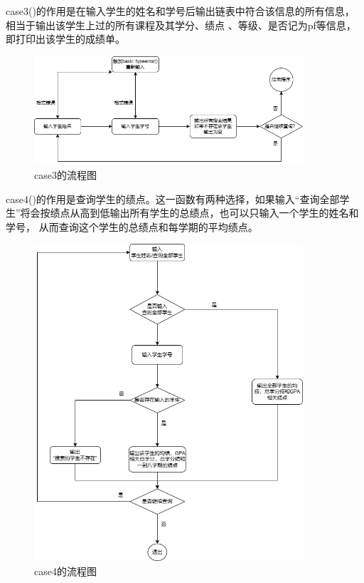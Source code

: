 \documentclass[fontset=windows]{article}
\begin{document}
case3()的作用是在输入学生的姓名和学号后输出链表中符合该信息的所有信息，相当于输出该学生上过的所有课程及其学分、绩点
、等级、是否记为pf等信息，即打印出该学生的成绩单。

\begin{figure}[h]
	\begin{center}
		\vspace{0.3cm}
		\includegraphics[width = 10cm]{case3.png}
		\vspace{1cm}
		\caption{case3的流程图}
	\end{center}
\end{figure}

case4()的作用是查询学生的绩点。这一函数有两种选择，如果输入“查询全部学生”将会按绩点从高到低输出所有学生的总绩点，也可以只输入一个学生的姓名和学号，
从而查询这个学生的总绩点和每学期的平均绩点。
\newpage
\begin{figure}[h]
	\begin{center}
		\includegraphics[width = 10cm]{case4.png}
		\vspace{1cm}
		\caption{case4的流程图}
	\end{center}
\end{figure}
\end{document}
